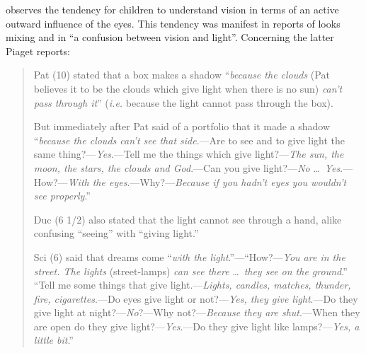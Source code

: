 \citet[48]{Piaget:1929dp} observes the tendency for children to understand vision in terms of an active outward influence of the eyes. This tendency was manifest in reports of looks mixing and in ``a confusion between vision and light''. Concerning the latter Piaget reports:
\begin{quotation}

	Pat (10) stated that a box makes a shadow ``\emph{because the clouds} (Pat believes it to be the clouds which give light when there is no sun) \emph{can't pass through it}'' (\emph{i.e.} because the light cannot pass through the box).
	
	But immediately after Pat said of a portfolio that it made a shadow ``\emph{because the clouds can't see that side}.---Are to see and to give light the same thing?---\emph{Yes}.---Tell me the things which give light?---\emph{The sun, the moon, the stars, the clouds and God}.---Can you give light?---\emph{No} \ldots\ \emph{Yes}.---How?---\emph{With the eyes}.---Why?---\emph{Because if you hadn't eyes you wouldn't see properly}.''
	
	Duc (6 1/2) also stated that the light cannot see through a hand, alike confusing ``seeing'' with ``giving light.''
	
	Sci (6) said that dreams come ``\emph{with the light}.''---``How?---\emph{You are in the street. The lights} (street-lamps) \emph{can see there} \ldots\ \emph{they see on the ground}.'' ``Tell me some things that give light.---\emph{Lights, candles, matches, thunder, fire, cigarettes}.---Do eyes give light or not?---\emph{Yes, they give light}.---Do they give light at night?---\emph{No}?---Why not?---\emph{Because they are shut}.---When they are open do they give light?---\emph{Yes}.---Do they give light like lamps?---\emph{Yes, a little bit}.'' \citep[48]{Piaget:1929dp}
\end{quotation}

